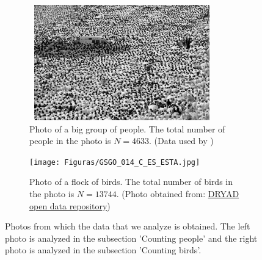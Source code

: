 \begin{figure}[h!]
  \begin{center}
  \begin{subfigure}[h!]{80mm}
    \includegraphics[width=80mm, height=50mm]{Figuras/1.jpg}\par
    \caption{Photo of a big group of people. The total number of people in the photo is $N=4633$. (Data used by \cite{personas})}
    \label{fig:Foto_Personas}
  \end{subfigure}
  \hfill
  \begin{subfigure}[h!]{80mm}
    \texttt{[image: Figuras/GSGO\_014\_C\_ES\_ESTA.jpg]}\par
    \caption{Photo of a flock of birds. The total number of birds in the photo is $N=13744$. (Photo obtained from: \href{https://datadryad.org/stash/dataset/doi:10.5061/dryad.98sf7m0hx}{DRYAD open data repository})}
    \label{fig:Foto_Pajaros}
  \end{subfigure}
  
  \caption{Photos from which the data that we analyze is obtained. The left photo is analyzed in the subsection 'Counting people' and the right photo is analyzed in the subsection 'Counting birds'.}
  \label{fig:Fotos}
  \end{center}
\end{figure}
